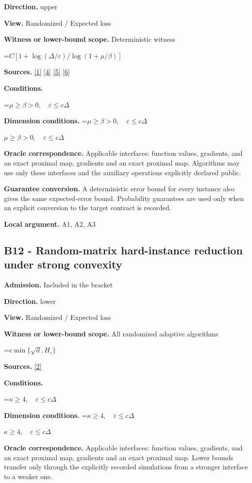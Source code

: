 \documentclass[10pt,a4paper]{article}
\newcommand{\AtlasMath}[1]{\par\begingroup\centering\setbox0=\hbox{$\displaystyle #1$}\ifdim\wd0>1.4\linewidth\typeout{ATLAS WIDE FORMULA: \the\wd0}\fi\ifdim\wd0>\linewidth\resizebox{\linewidth}{!}{\box0}\else\box0\fi\par\endgroup}
\newcommand{\AtlasInlineMath}[1]{\begingroup\setbox0=\hbox{$#1$}\ifdim\wd0>.4\linewidth\endgroup\AtlasMath{#1}\else\endgroup$#1$\fi}
\begin{document}
\textbf{Direction.} upper

\textbf{View.} Randomized / Expected loss

\textbf{Witness or lower-bound scope.} Deterministic witness

\AtlasMath{C[1+\log(\Delta/\varepsilon)/\log(1+\mu/\beta)]}
\textbf{Sources.} \href{https://www.tau.ac.il/~becka/FISTA.pdf}{[1]} \href{https://arxiv.org/pdf/1405.4980}{[4]} \href{https://www2.isye.gatech.edu/~nemirovs/MOR_AccuracyCertificates.pdf}{[5]} \href{https://arxiv.org/pdf/2609.20701}{[6]}

\textbf{Conditions.} 
\AtlasMath{\mu\ge\beta>0,\quad\varepsilon\le c\Delta}


\textbf{Dimension conditions.} \AtlasInlineMath{\mu\ge\beta>0,\quad\varepsilon\le c\Delta}

\textbf{Oracle correspondence.} Applicable interfaces: function values, gradients, and an exact proximal map, gradients and an exact proximal map. Algorithms may use only these interfaces and the auxiliary operations explicitly declared public.

\textbf{Guarantee conversion.} A deterministic error bound for every instance also gives the same expected-error bound. Probability guarantees are used only when an explicit conversion to the target contract is recorded.

\textbf{Local argument.} A1, A2, A3

\subsection{B12 - Random-matrix hard-instance reduction under strong convexity}
\textbf{Admission.} Included in the bracket

\textbf{Direction.} lower

\textbf{View.} Randomized / Expected loss

\textbf{Witness or lower-bound scope.} All randomized adaptive algorithms

\AtlasMath{c\min\{\sqrt d,H_\varepsilon\}}
\textbf{Sources.} \href{https://arxiv.org/pdf/2609.10874}{[2]}

\textbf{Conditions.} 
\AtlasMath{\kappa\ge4,\quad\varepsilon\le c\Delta}


\textbf{Dimension conditions.} \AtlasInlineMath{\kappa\ge4,\quad\varepsilon\le c\Delta}

\textbf{Oracle correspondence.} Applicable interfaces: function values, gradients, and an exact proximal map, gradients and an exact proximal map. Lower bounds transfer only through the explicitly recorded simulations from a stronger interface to a weaker one.
\end{document}
